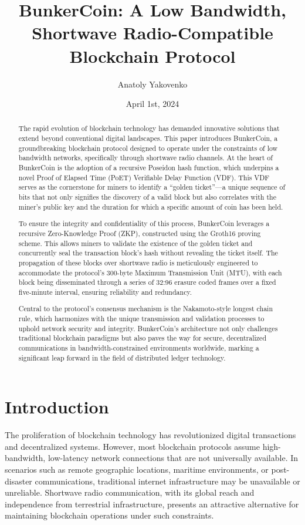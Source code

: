 \documentclass[11pt,a4paper]{article}
\title{BunkerCoin: A Low Bandwidth, Shortwave Radio-Compatible Blockchain Protocol}
\author{Anatoly Yakovenko}
\date{April 1st, 2024}
\begin{document}
\maketitle

\begin{abstract}
The rapid evolution of blockchain technology has demanded innovative solutions that extend beyond conventional digital landscapes. This paper introduces BunkerCoin, a groundbreaking blockchain protocol designed to operate under the constraints of low bandwidth networks, specifically through shortwave radio channels. At the heart of BunkerCoin is the adoption of a recursive Poseidon hash function, which underpins a novel Proof of Elapsed Time (PoET) Verifiable Delay Function (VDF). This VDF serves as the cornerstone for miners to identify a ``golden ticket''---a unique sequence of bits that not only signifies the discovery of a valid block but also correlates with the miner's public key and the duration for which a specific amount of coin has been held.

To ensure the integrity and confidentiality of this process, BunkerCoin leverages a recursive Zero-Knowledge Proof (ZKP), constructed using the Groth16 proving scheme. This allows miners to validate the existence of the golden ticket and concurrently seal the transaction block's hash without revealing the ticket itself. The propagation of these blocks over shortwave radio is meticulously engineered to accommodate the protocol's 300-byte Maximum Transmission Unit (MTU), with each block being disseminated through a series of 32:96 erasure coded frames over a fixed five-minute interval, ensuring reliability and redundancy.

Central to the protocol's consensus mechanism is the Nakamoto-style longest chain rule, which harmonizes with the unique transmission and validation processes to uphold network security and integrity. BunkerCoin's architecture not only challenges traditional blockchain paradigms but also paves the way for secure, decentralized communications in bandwidth-constrained environments worldwide, marking a significant leap forward in the field of distributed ledger technology.
\end{abstract}

\section{Introduction}

The proliferation of blockchain technology has revolutionized digital transactions and decentralized systems. However, most blockchain protocols assume high-bandwidth, low-latency network connections that are not universally available. In scenarios such as remote geographic locations, maritime environments, or post-disaster communications, traditional internet infrastructure may be unavailable or unreliable. Shortwave radio communication, with its global reach and independence from terrestrial infrastructure, presents an attractive alternative for maintaining blockchain operations under such constraints.
\end{document}
